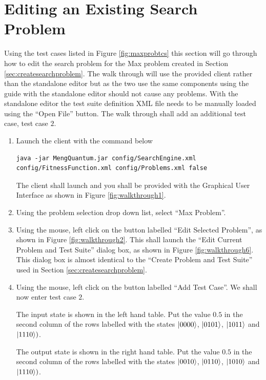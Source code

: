 \section{Editing an Existing Search Problem}

Using the test cases listed in Figure \ref{fig:maxprobtcs} this section will go through how to edit the search problem for the Max problem created in Section \ref{sec:createsearchproblem}.
The walk through will use the provided client rather than the standalone editor but as the two use the same components using the guide with the standalone editor should not cause any problems.
With the standalone editor the test suite definition XML file needs to be manually loaded using the ``Open File'' button.
The walk through shall add an additional test case, test case $2$.

\begin{enumerate}
 \item Launch the client with the command below
\begin{lstlisting}
java -jar MengQuantum.jar config/SearchEngine.xml config/FitnessFunction.xml config/Problems.xml false
\end{lstlisting}
The client shall launch and you shall be provided with the Graphical User Interface as shown in Figure \ref{fig:walkthrough1}.

\item Using the problem selection drop down list, select ``Max Problem''.

\item Using the mouse, left click on the button labelled ``Edit Selected Problem'', as shown in Figure \ref{fig:walkthrough2}.
This shall launch the ``Edit Current Problem and Test Suite'' dialog box, as shown in Figure \ref{fig:walkthrough6}.
This dialog box is almost identical to the ``Create Problem and Test Suite'' used in Section \ref{sec:createsearchproblem}.

\item Using the mouse, left click on the button labelled ``Add Test Case''.
We shall now enter test case $2$.

The input state is shown in the left hand table.
Put the value $0.5$ in the second column of the rows labelled with the states $\left\vert{0000}\right\rangle$, $\left\vert{0101}\right\rangle$, $\left\vert{1011}\right\rangle$ and $\left\vert{1110}\right\rangle)$.

The output state is shown in the right hand table.
Put the value $0.5$ in the second column of the rows labelled with the states $\left\vert{0010}\right\rangle$, $\left\vert{0110}\right\rangle$, $\left\vert{1010}\right\rangle$ and $\left\vert{1110}\right\rangle)$.


\end{enumerate}
